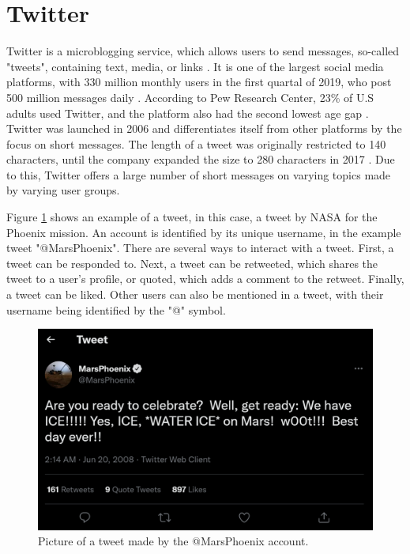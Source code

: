\section{Twitter}
Twitter is a microblogging service, which allows users to send messages, so-called "tweets", containing text, media, or links \cite{DBLP:journals/csur/GiachanouC16}. It is one of the largest social media platforms, with 330 million monthly users in the first quartal of 2019, who post 500 million messages daily \cite{twitter:users}. According to Pew Research Center, 23\% of U.S adults used Twitter, and the platform also had the second lowest age gap \cite{pew:socialmedia}. Twitter was launched in 2006 and differentiates itself from other platforms by the focus on short messages. The length of a tweet was originally restricted to 140 characters, until the company expanded the size to 280 characters in 2017 \cite{twitter:characters}. Due to this, Twitter offers a large number of short messages on varying topics made by varying user groups. 

Figure \ref{fig:example_tweet} shows an example of a tweet, in this case, a tweet by NASA for the Phoenix mission. An account is identified by its unique username, in the example tweet "@MarsPhoenix". There are several ways to interact with a tweet. First, a tweet can be responded to. Next, a tweet can be retweeted, which shares the tweet to a user's profile, or quoted, which adds a comment to the retweet. Finally, a tweet can be liked. Other users can also be mentioned in a tweet, with their username being identified by the "@" symbol. 

\begin{figure}
    \centering
    \includegraphics[scale=0.3]{Images/twitter_image.png}
    \caption{Picture of a tweet made by the @MarsPhoenix account.}
    \label{fig:example_tweet}
\end{figure}

